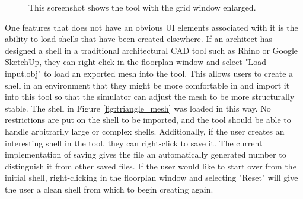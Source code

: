 \documentclass{thesis}
\begin{document}
\begin{figure}
\caption[Zoomed in grid]{This screenshot shows the tool with the grid window enlarged.}
\label{fig:big_grid}
\end{figure}

One features that does not have an obvious UI elements associated with it is the ability to load shells that have been created
elsewhere.  If an architect has designed a shell in a traditional architectural CAD tool such as Rhino or Google SketchUp, they
can right-click in the floorplan window and select "Load input.obj" to load an exported mesh into the tool.  This allows users
to create a shell in an environment that they might be more comfortable in and import it into this tool so that the simulator
can adjust the mesh to be more structurally stable.  The shell in Figure \ref{fig:triangle_mesh} was loaded in this way.  No
restrictions are put on the shell to be imported, and the tool should be able to handle arbitrarily large or complex shells.
Additionally, if the user creates an interesting shell in the tool, they can right-click to save it.  The current implementation
of saving gives the file an automatically generated number to distinguish it from other saved files.  If the user would like to
start over from the initial shell, right-clicking in the floorplan window and selecting "Reset" will give the user a clean shell
from which to begin creating again.
\end{document}
